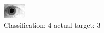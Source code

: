 \begin{figure}[h!]
\begin{center}
\includegraphics[width=0.60\columnwidth]{figures/ID1914_class_4_target_3.png}
\end{center}
\caption{ Classification: 4 actual target: 3}
\label{fig:ID1914_class_4_target_3}
\end{figure}
